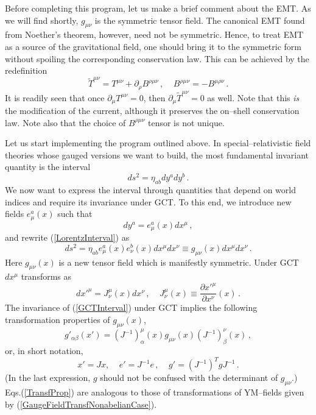\documentclass[12pt]{article}
\begin{document}
Before completing this program, let us make a brief comment about the EMT. As we will find shortly, $g_{\mu\nu}$ is the symmetric tensor field. The canonical EMT found from Noether's theorem, however, need not be symmetric. Hence, to treat EMT as a source of the gravitational field, one should bring it to the symmetric form without spoiling the corresponding conservation law. This can be achieved by the redefinition \cite{DiFrancesco:1997nk}
\begin{equation}
\tilde{T}^{\mu\nu}=T^{\mu\nu}+\partial_\rho B^{\rho\mu\nu} \,, ~~~~~ B^{\rho\mu\nu}=-B^{\mu\rho\nu} \,.
\end{equation}
It is readily seen that once $\partial_\mu T^{\mu\nu}=0$, then $\partial_\mu \tilde{T}^{\mu\nu}=0$ as well. Note that this \textit{is} the modification of the current, although it preserves the on--shell conservation law. Note also that the choice of $B^{\rho\mu\nu}$ tensor is not unique.

Let us start implementing the program outlined above. In special--relativistic field theories whose gauged versions we want to build, the most fundamental invariant quantity is the interval
\begin{equation}\label{LorentzInterval}
ds^2=\eta_{ab}dy^a dy^b \,.
\end{equation}
We now want to express the interval through quantities that depend on world indices and require its invariance under GCT. To this end, we introduce new fields $e^a_\mu(x)$ such that
\begin{equation}
dy^a = e^a_\mu(x) dx^\mu \,,
\end{equation}
and rewrite (\ref{LorentzInterval}) as
\begin{equation}\label{GCTInterval}
ds^2=\eta_{ab}e^a_\mu(x)e^b_\nu(x)dx^\mu dx^\nu \equiv g_{\mu\nu}(x)dx^\mu dx^\nu \,.
\end{equation}
Here $g_{\mu\nu}(x)$ is a new tensor field which is manifestly symmetric. Under GCT $dx^\mu$ transforms as
\begin{equation}
dx'^\mu=J^\mu_\nu(x) dx^\nu \,, ~~~~~ J^\mu_\nu(x)\equiv\dfrac{\partial x'^\mu}{\partial x^\nu}(x) \,.
\end{equation}
The invariance of (\ref{GCTInterval}) under GCT implies the following transformation properties of $g_{\mu\nu}(x)$,
\begin{equation}
g'_{\alpha\beta}(x')=(J^{-1})^\mu_\alpha(x) g_{\mu\nu}(x)(J^{-1})^\nu_\beta(x) \,,
\end{equation}
or, in short notation,
\begin{equation}\label{TransfProp}
x'=Jx, ~~~~~e'=J^{-1}e \,,~~~~~ g'=(J^{-1})^TgJ^{-1} \,.
\end{equation}
(In the last expression, $g$ should not be confused with the determinant of $g_{\mu\nu}$.) Eqs.(\ref{TransfProp}) are analogous to those of transformations of YM--fields given by (\ref{GaugeFieldTransfNonabelianCase}).
\end{document}
